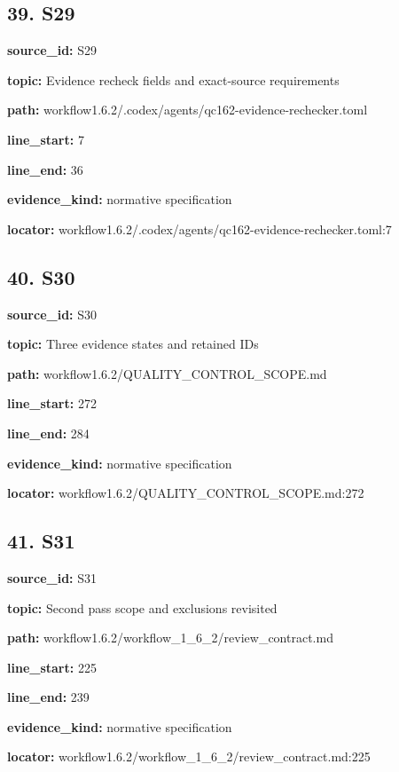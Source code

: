 \documentclass[10pt,a4paper]{article}
\begin{document}
\subsection*{39.\allowbreak{} S29}
\textbf{source\_\allowbreak{}id:} S29\par
\textbf{topic:} Evidence recheck fields and exact-\allowbreak{}source requirements\par
\textbf{path:} workflow1.\allowbreak{}6.\allowbreak{}2/\allowbreak{}.\allowbreak{}codex/\allowbreak{}agents/\allowbreak{}qc162-\allowbreak{}evidence-\allowbreak{}rechecker.\allowbreak{}toml\par
\textbf{line\_\allowbreak{}start:} 7\par
\textbf{line\_\allowbreak{}end:} 36\par
\textbf{evidence\_\allowbreak{}kind:} normative specification\par
\textbf{locator:} workflow1.\allowbreak{}6.\allowbreak{}2/\allowbreak{}.\allowbreak{}codex/\allowbreak{}agents/\allowbreak{}qc162-\allowbreak{}evidence-\allowbreak{}rechecker.\allowbreak{}toml:7\par
\subsection*{40.\allowbreak{} S30}
\textbf{source\_\allowbreak{}id:} S30\par
\textbf{topic:} Three evidence states and retained IDs\par
\textbf{path:} workflow1.\allowbreak{}6.\allowbreak{}2/\allowbreak{}QUALITY\_\allowbreak{}CONTROL\_\allowbreak{}SCOPE.\allowbreak{}md\par
\textbf{line\_\allowbreak{}start:} 272\par
\textbf{line\_\allowbreak{}end:} 284\par
\textbf{evidence\_\allowbreak{}kind:} normative specification\par
\textbf{locator:} workflow1.\allowbreak{}6.\allowbreak{}2/\allowbreak{}QUALITY\_\allowbreak{}CONTROL\_\allowbreak{}SCOPE.\allowbreak{}md:272\par
\subsection*{41.\allowbreak{} S31}
\textbf{source\_\allowbreak{}id:} S31\par
\textbf{topic:} Second pass scope and exclusions revisited\par
\textbf{path:} workflow1.\allowbreak{}6.\allowbreak{}2/\allowbreak{}workflow\_\allowbreak{}1\_\allowbreak{}6\_\allowbreak{}2/\allowbreak{}review\_\allowbreak{}contract.\allowbreak{}md\par
\textbf{line\_\allowbreak{}start:} 225\par
\textbf{line\_\allowbreak{}end:} 239\par
\textbf{evidence\_\allowbreak{}kind:} normative specification\par
\textbf{locator:} workflow1.\allowbreak{}6.\allowbreak{}2/\allowbreak{}workflow\_\allowbreak{}1\_\allowbreak{}6\_\allowbreak{}2/\allowbreak{}review\_\allowbreak{}contract.\allowbreak{}md:225\par
\end{document}
